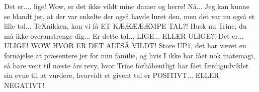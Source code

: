 \documentclass[a4paper,11pt]{article}
\begin{document}
\begin{sketch}
 Det er.... lige!
 Wow, er det ikke vildt mine damer og herre! 
 Nå... Jeg kan kunne se blandt jer, at der var enkelte der også havde luret den, men det var nu også et lille tal... TeXnikken, kan vi få ET KÆÆÆÆÆMPE TAL?!
 Husk nu Trine, du må ikke overanstrenge dig... Er dette tal... LIGE... ELLER ULIGE?!
 Det er... ULIGE!
 WOW HVOR ER DET ALTSÅ VILDT!  Store UP1, det har været en fornøjelse at præsentere jer for min familie, og hvis I ikke har fået nok matemagi, så bare vent til næste års revy, hvor Trine forhåbentligt har fået færdigudviklet sin evne til at vurdere, hvorvidt et givent tal er POSITIVT... ELLER NEGATIVT!
\end{sketch}
\end{document}
